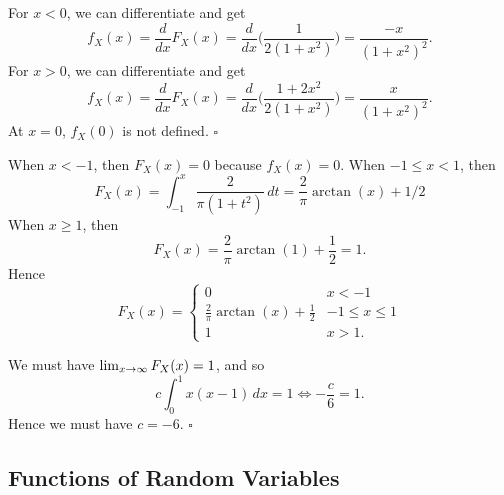\begin{problem}
For $x < 0$, we can differentiate and get
    \[
        f_X (x) = \frac{d}{dx} F_X (x) = \frac{d}{dx} \Big( \frac{1}{2 (1 + x^2 ) }\Big) = \frac{-x}{(1 + x^2)^2} .
    \]
For $x > 0$, we can differentiate and get
    \[
        f_X (x) = \frac{d}{dx} F_X (x) = \frac{d}{dx} \Big( \frac{1 + 2x^2}{2 (1 + x^2)} \Big) = \frac{x}{(1 + x^2)^2} .
    \]
At $x = 0$, $f_X(0)$ is not defined. \hfill $\square$
\end{problem}

\begin{problem}\label{Prob:FindDistroFunction}
When $x < -1$, then $F_X (x) = 0$ because $f_X (x) = 0$. When $-1 \leq x < 1$, then
    \[
        F_X (x) = \int_{-1}^x \frac{2}{\pi (1 + t^2)} \, dt = \frac{2}{\pi} \arctan (x) + 1/2
    \]
When $x \geq 1$, then
    \[
        F_X (x) = \frac{2}{\pi} \arctan (1) + \frac{1}{2} = 1 .
    \]
Hence
    \[
        F_X (x) = \left\lbrace \begin{matrix} 0 & x < -1 \\ 
        \frac{2}{\pi} \arctan (x) + \frac{1}{2} & -1 \leq x \leq 1 \\ 
        1 & x > 1 . \end{matrix} \right. \tag*{$\square$}
    \]
\end{problem}

\begin{problem}\label{Prob:FindDistroFunction2}
We must have $\lim_{x \rightarrow \infty} F_X (x) = 1$, and so
    \[
        c\int_0^1 x (x - 1) \, dx = 1 \iff -\frac{c}{6} = 1 .
    \]
Hence we must have $c = -6$. \hfill $\square$
\end{problem}

\subsection{Functions of Random Variables}

